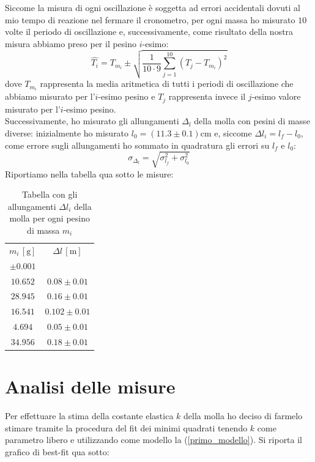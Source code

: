\documentclass{article}
\begin{document}
\noindent Siccome la misura di ogni oscillazione è soggetta ad errori accidentali dovuti al mio tempo di reazione nel fermare il cronometro, per ogni massa ho misurato $10$ volte il periodo di oscillazione e, successivamente, come risultato della nostra misura abbiamo preso per il pesino $i$-esimo:
$$
\hat{T_i} = T_{m_i} \pm \sqrt{\frac{1}{10 \cdot 9} \sum_{j=1}^{10} (T_j - T_{m_i})^2}
$$
dove $T_{m_i}$ rappresenta la media aritmetica di tutti i periodi di oscillazione che abbiamo misurato per l'$i$-esimo pesino e $T_j$ rappresenta invece il $j$-esimo valore misurato per l'$i$-esimo pesino. \\
Successivamente, ho misurato gli allungamenti $\Delta_l$ della molla con pesini di masse diverse: inizialmente ho misurato $l_0 = (11.3 \pm 0.1) \si{\centi\meter}$ e, siccome $\Delta l_i = l_f - l_0$, come errore sugli allungamenti ho sommato in quadratura gli errori su $l_f$ e $l_0$:
$$
\sigma_{\Delta_l} = \sqrt{\sigma_{l_f}^2 + \sigma_{l_0}^2}
$$
Riportiamo nella tabella qua sotto le misure:
\begin{table}[H]
	\centering
	\begin{tabular}{c c}
	\toprule
	$m_i \, [\si{\gram}]$ & $\Delta l \, [\si{\meter}]$ \\
	$\pm 0.001$ & \\
	\toprule
	$10.652$ & $0.08 \pm 0.01$ \\
	$28.945$ & $0.16 \pm 0.01$ \\
	$16.541$ & $0.102 \pm 0.01$ \\
	$4.694$ & $0.05 \pm 0.01$ \\
	$34.956$ & $0.18 \pm 0.01$ \\
	\bottomrule
	\end{tabular}
	\caption{Tabella con gli allungamenti $\Delta l_i$ della molla per ogni pesino di massa $m_i$}
\end{table}
\section{Analisi delle misure}
Per effettuare la stima della costante elastica $k$ della molla ho deciso di farmelo stimare tramite la procedura del fit dei minimi quadrati tenendo $k$ come parametro libero e utilizzando come modello la (\ref{primo_modello}). Si riporta il grafico di best-fit qua sotto:
\end{document}
